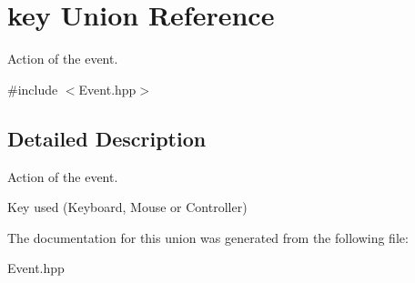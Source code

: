 \hypertarget{unionkey}{}\section{key Union Reference}
\label{unionkey}


Action of the event.  




{\ttfamily \#include $<$Event.\+hpp$>$}



\subsection{Detailed Description}
Action of the event. 

Key used (Keyboard, Mouse or Controller) 

The documentation for this union was generated from the following file\+:\begin{DoxyCompactItemize}
\item 
Event.\+hpp\end{DoxyCompactItemize}
